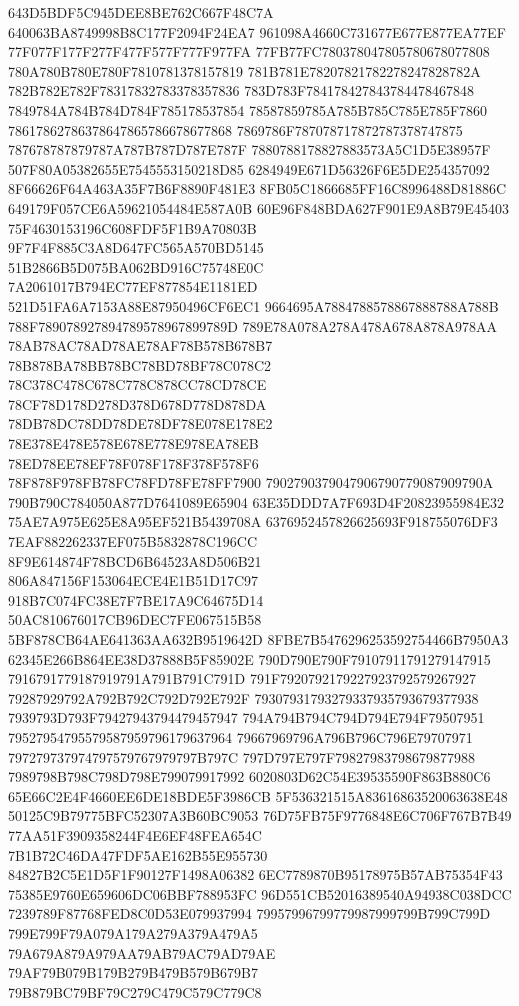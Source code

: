 643D5BDF5C945DEE8BE762C667F48C7A
640063BA8749998B8C177F2094F24EA7
961098A4660C731677E677E877EA77EF
77F077F177F277F477F577F777F977FA
77FB77FC780378047805780678077808
780A780B780E780F7810781378157819
781B781E78207821782278247828782A
782B782E782F78317832783378357836
783D783F784178427843784478467848
7849784A784B784D784F785178537854
78587859785A785B785C785E785F7860
78617862786378647865786678677868
7869786F787078717872787378747875
787678787879787A787B787D787E787F
7880788178827883573A5C1D5E38957F
507F80A05382655E7545553150218D85
6284949E671D56326F6E5DE254357092
8F66626F64A463A35F7B6F8890F481E3
8FB05C1866685FF16C8996488D81886C
649179F057CE6A59621054484E587A0B
60E96F848BDA627F901E9A8B79E45403
75F4630153196C608FDF5F1B9A70803B
9F7F4F885C3A8D647FC565A570BD5145
51B2866B5D075BA062BD916C75748E0C
7A2061017B794EC77EF877854E1181ED
521D51FA6A7153A88E87950496CF6EC1
9664695A7884788578867888788A788B
788F789078927894789578967899789D
789E78A078A278A478A678A878A978AA
78AB78AC78AD78AE78AF78B578B678B7
78B878BA78BB78BC78BD78BF78C078C2
78C378C478C678C778C878CC78CD78CE
78CF78D178D278D378D678D778D878DA
78DB78DC78DD78DE78DF78E078E178E2
78E378E478E578E678E778E978EA78EB
78ED78EE78EF78F078F178F378F578F6
78F878F978FB78FC78FD78FE78FF7900
7902790379047906790779087909790A
790B790C784050A877D7641089E65904
63E35DDD7A7F693D4F20823955984E32
75AE7A975E625E8A95EF521B5439708A
6376952457826625693F918755076DF3
7EAF882262337EF075B5832878C196CC
8F9E614874F78BCD6B64523A8D506B21
806A847156F153064ECE4E1B51D17C97
918B7C074FC38E7F7BE17A9C64675D14
50AC810676017CB96DEC7FE067515B58
5BF878CB64AE641363AA632B9519642D
8FBE7B5476296253592754466B7950A3
62345E266B864EE38D37888B5F85902E
790D790E790F79107911791279147915
7916791779187919791A791B791C791D
791F7920792179227923792579267927
79287929792A792B792C792D792E792F
79307931793279337935793679377938
7939793D793F79427943794479457947
794A794B794C794D794E794F79507951
79527954795579587959796179637964
79667969796A796B796C796E79707971
797279737974797579767979797B797C
797D797E797F79827983798679877988
7989798B798C798D798E799079917992
6020803D62C54E39535590F863B880C6
65E66C2E4F4660EE6DE18BDE5F3986CB
5F536321515A83616863520063638E48
50125C9B79775BFC52307A3B60BC9053
76D75FB75F9776848E6C706F767B7B49
77AA51F3909358244F4E6EF48FEA654C
7B1B72C46DA47FDF5AE162B55E955730
84827B2C5E1D5F1F90127F1498A06382
6EC7789870B95178975B57AB75354F43
75385E9760E659606DC06BBF788953FC
96D551CB52016389540A94938C038DCC
7239789F87768FED8C0D53E079937994
79957996799779987999799B799C799D
799E799F79A079A179A279A379A479A5
79A679A879A979AA79AB79AC79AD79AE
79AF79B079B179B279B479B579B679B7
79B879BC79BF79C279C479C579C779C8
